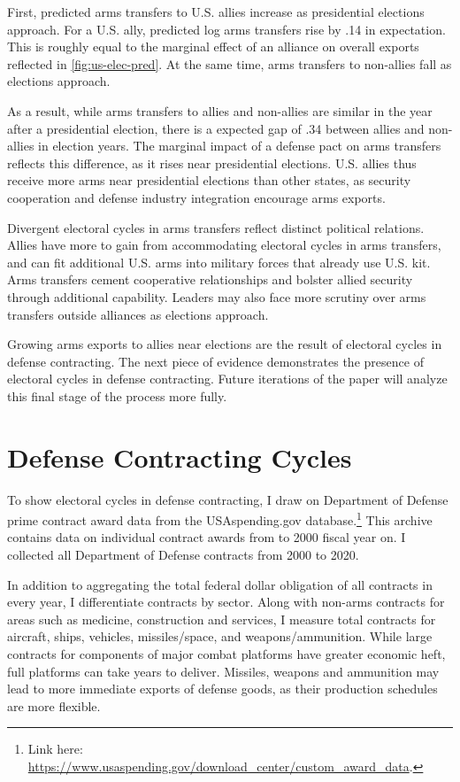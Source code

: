 \documentclass[12pt]{article}
\begin{document}
First, predicted arms transfers to U.S. allies increase as presidential elections approach.
For a U.S. ally, predicted log arms transfers rise by .14 in expectation. 
This is roughly equal to the marginal effect of an alliance on overall exports reflected in \autoref{fig:us-elec-pred}.
At the same time, arms transfers to non-allies fall as elections approach. 


As a result, while arms transfers to allies and non-allies are similar in the year after a presidential election, there is a expected gap of .34 between allies and non-allies in election years.
The marginal impact of a defense pact on arms transfers reflects this difference, as it rises near presidential elections.
U.S. allies thus receive more arms near presidential elections than other states, as security cooperation and defense industry integration encourage arms exports.


Divergent electoral cycles in arms transfers reflect distinct political relations.
Allies have more to gain from accommodating electoral cycles in arms transfers, and can fit additional U.S. arms into military forces that already use U.S. kit.
Arms transfers cement cooperative relationships and bolster allied security through additional capability.
Leaders may also face more scrutiny over arms transfers outside alliances as elections approach. 


Growing arms exports to allies near elections are the result of electoral cycles in defense contracting. 
The next piece of evidence demonstrates the presence of electoral cycles in defense contracting.  
Future iterations of the paper will analyze this final stage of the process more fully. 



\section{Defense Contracting Cycles}


To show electoral cycles in defense contracting, I draw on Department of Defense prime contract award data from the USAspending.gov database.\footnote{Link here: \url{https://www.usaspending.gov/download_center/custom_award_data}.} 
This archive contains data on individual contract awards from to 2000 fiscal year on.
I collected all Department of Defense contracts from 2000 to 2020.


In addition to aggregating the total federal dollar obligation of all contracts in every year, I differentiate contracts by sector.
Along with non-arms contracts for areas such as medicine, construction and services, I measure total contracts for aircraft, ships, vehicles, missiles/space, and weapons/ammunition. 
While large contracts for components of major combat platforms have greater economic heft, full platforms can take years to deliver. 
Missiles, weapons and ammunition may lead to more immediate exports of defense goods, as their production schedules are more flexible.
\end{document}
